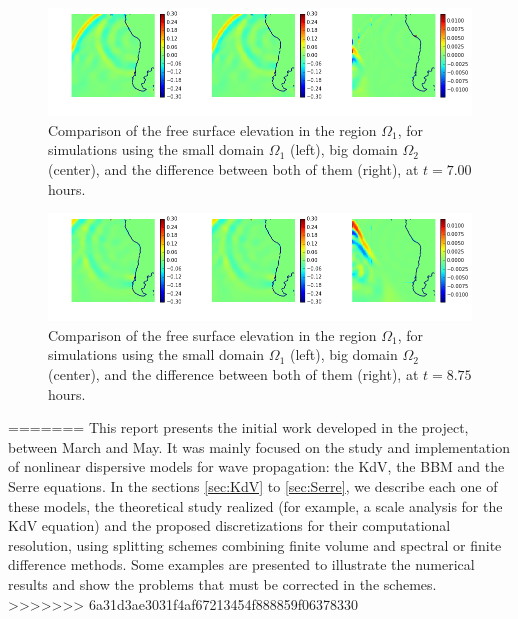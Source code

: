 \begin{figure}
	\center
	\includegraphics[width=\textwidth]{figures/GeoclawChile2010_comparison_it28}
	\caption{Comparison of  the free surface elevation in the region $\Omega_1$, for simulations using the small domain $\Omega_1$ (left), big domain $\Omega_2$ (center), and the difference between both of them (right), at $t=7.00$ hours.}
	\label{intro:results_frame28}
\end{figure}

\begin{figure}
	\center
	\includegraphics[width=\textwidth]{figures/GeoclawChile2010_comparison_it35}
	\caption{Comparison of the free surface elevation in the region $\Omega_1$, for simulations using the small domain $\Omega_1$ (left), big domain $\Omega_2$ (center), and the difference between both of them (right), at $t=8.75$ hours.}
	\label{intro:results_frame35}
\end{figure}
=======
\indent This report presents the initial work developed in the project, between March and May. It was mainly focused on the study and implementation of nonlinear dispersive models for wave propagation: the KdV, the BBM and the Serre equations. In the sections \ref{sec:KdV} to \ref{sec:Serre}, we describe each one of these models, the theoretical study realized (for example, a scale analysis for the KdV equation) and the proposed discretizations for their computational resolution, using splitting schemes combining finite volume and spectral or finite difference methods. Some examples are presented to illustrate the numerical results and show the problems that must be corrected in the schemes.
>>>>>>> 6a31d3ae3031f4af67213454f888859f06378330

